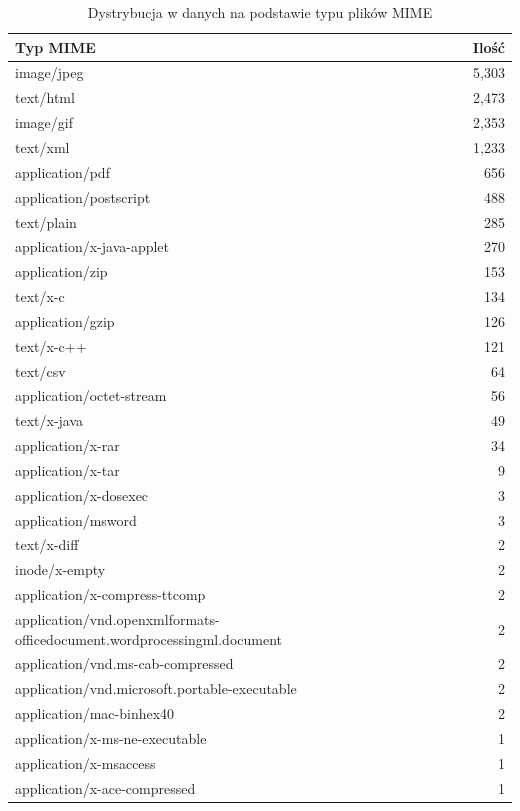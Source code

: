 \begin{table}[hb]
    \centering
    \begin{tabular}{lr}
        \hline
        \textbf{Typ MIME} & \textbf{Ilość} \\
        \hline
        image/jpeg & 5,303 \\
        text/html & 2,473 \\
        image/gif & 2,353 \\
        text/xml & 1,233 \\
        application/pdf & 656 \\
        application/postscript & 488 \\
        text/plain & 285 \\
        application/x-java-applet & 270 \\
        application/zip & 153 \\
        text/x-c & 134 \\
        application/gzip & 126 \\
        text/x-c++ & 121 \\
        text/csv & 64 \\
        application/octet-stream & 56 \\
        text/x-java & 49 \\
        application/x-rar & 34 \\
        application/x-tar & 9 \\
        application/x-dosexec & 3 \\
        application/msword & 3 \\
        text/x-diff & 2 \\
        inode/x-empty & 2 \\
        application/x-compress-ttcomp & 2 \\
        application/vnd.openxmlformats-officedocument.wordprocessingml.document & 2 \\
        application/vnd.ms-cab-compressed & 2 \\
        application/vnd.microsoft.portable-executable & 2 \\
        application/mac-binhex40 & 2 \\
        application/x-ms-ne-executable & 1 \\
        application/x-msaccess & 1 \\
        application/x-ace-compressed & 1 \\
        \hline
    \end{tabular}
    \caption{Dystrybucja w danych na podstawie typu plików MIME}
    \label{tabela:typyMIMEdataset}
\end{table}

